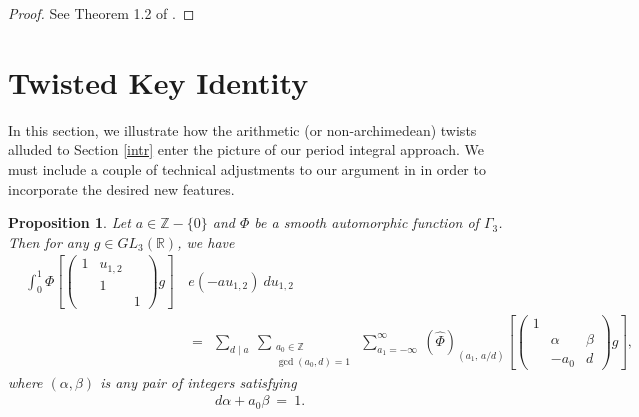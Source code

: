 \documentclass[11pt,reqno]{amsart}
\newtheorem{prop}[thm]{Proposition}
\theoremstyle{definition}
\theoremstyle{definition}
\theoremstyle{remark}
\newcommand{\R}{\ensuremath{\mathbb{R}}}
\newcommand{\Z}{\ensuremath{\mathbb{Z}}}
\numberwithin{equation}{section}
\begin{document}
			\begin{proof}
				See Theorem 1.2 of \cite{Kw23}. 
			\end{proof}
			
			
		

			
			





 \section{Twisted Key Identity}\label{Basicide}

  In this section, we illustrate how the arithmetic  (or non-archimedean) twists alluded to Section \ref{intr} enter the picture of our period integral approach. We must include a couple of technical adjustments to our argument in  \cite{Kw23} in order to  incorporate the desired new features. 
  


 
 \begin{prop}\label{incomf}
 Let  $a\in \Z-\{0\}$  and $\Phi$ be a smooth automorphic function  of  $\Gamma_{3}$. Then for any $g\in GL_{3}(\R)$,  we have
 	\begin{align}\label{keylemform}
	\hspace{10pt}	\int_{0}^{1} \Phi\left[
	\begin{pmatrix}
		1 & u_{1,2} &  \\
		& 1          & \\
		&             & 1
	\end{pmatrix} g\right] \, &   e( -a u_{1,2}) \ du_{1,2}  \nonumber\\ 
	\ &= \ \   \sum_{d \mid a} \ 
	\sum_{\substack{a_{0} \in \Z  \\ \gcd(a_{0}, d)=1}} \ \sum_{a_{1}=-\infty}^{\infty} \  \left(\widehat{\Phi}\right)_{(a_{1},\, a/d)}\left[\begin{pmatrix}
		1 &            &         \\
		& \alpha & \beta \\
		& -a_{0} & d
	\end{pmatrix}g\right],
\end{align}
where  $(\alpha, \beta)$ is any pair of integers satisfying 
\begin{align}\label{extrstr}
	d\alpha+a_{0}\beta \ = \ 1. 
\end{align} 
 \end{prop}
\end{document}
